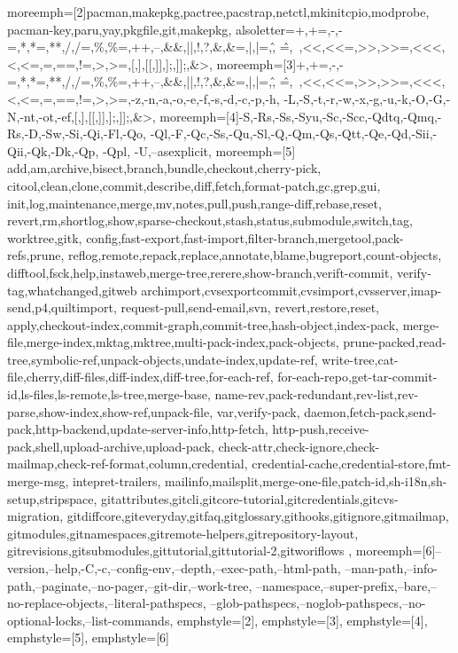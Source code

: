 {  %
  moreemph=[2]{pacman,makepkg,pactree,pacstrap,netctl,mkinitcpio,modprobe,
  pacman-key,paru,yay,pkgfile,git,makepkg},
  alsoletter={+,+=,-,-=,*,*=,**,/,/=,\%,\%=,++,--,\&\&,||,!,?,\&,\&=,|,|=,\^,
  \^=,~,<<,<<=,>>,>>=,<<<,<,<=,=,==,!=,>,>=,[,],[[,]],];,]];,\&>},
  moreemph=[3]{+,+=,-,-=,*,*=,**,/,/=,\%,\%=,++,--,\&\&,||,!,?,\&,\&=,|,|=,\^,
  \^=,~,<<,<<=,>>,>>=,<<<,<,<=,=,==,!=,>,>=,-z,-n,-a,-o,-e,-f,-s,-d,-c,-p,-h,
  -L,-S,-t,-r,-w,-x,-g,-u,-k,-O,-G,-N,-nt,-ot,-ef,[,],[[,]],];,]];,\&>},
  moreemph=[4]{-S,-Rs,-Ss,-Syu,-Sc,-Scc,-Qdtq,-Qmq,-Rs,-D,-Sw,-Si,-Qi,-Fl,-Qo,
  -Ql,-F,-Qc,-Ss,-Qu,-Sl,-Q,-Qm,-Qs,-Qtt,-Qe,-Qd,-Sii,-Qii,-Qk,-Dk,-Qp, -Qpl,
  -U,--asexplicit},
  moreemph=[5]{%
    add,am,archive,bisect,branch,bundle,checkout,cherry-pick,
    citool,clean,clone,commit,describe,diff,fetch,format-patch,gc,grep,gui,
    init,log,maintenance,merge,mv,notes,pull,push,range-diff,rebase,reset,
    revert,rm,shortlog,show,sparse-checkout,stash,status,submodule,switch,tag,
    worktree,gitk,
    config,fast-export,fast-import,filter-branch,mergetool,pack-refs,prune,
    reflog,remote,repack,replace,annotate,blame,bugreport,count-objects,
    difftool,fsck,help,instaweb,merge-tree,rerere,show-branch,verift-commit,
    verify-tag,whatchanged,gitweb
    archimport,cvsexportcommit,cvsimport,cvsserver,imap-send,p4,quiltimport,
    request-pull,send-email,svn,
    revert,restore,reset,
    apply,checkout-index,commit-graph,commit-tree,hash-object,index-pack,
    merge-file,merge-index,mktag,mktree,multi-pack-index,pack-objects,
    prune-packed,read-tree,symbolic-ref,unpack-objects,undate-index,update-ref,
    write-tree,cat-file,cherry,diff-files,diff-index,diff-tree,for-each-ref,
    for-each-repo,get-tar-commit-id,ls-files,ls-remote,ls-tree,merge-base,
    name-rev,pack-redundant,rev-list,rev-parse,show-index,show-ref,unpack-file,
    var,verify-pack,
    daemon,fetch-pack,send-pack,http-backend,update-server-info,http-fetch,
    http-push,receive-pack,shell,upload-archive,upload-pack,
    check-attr,check-ignore,check-mailmap,check-ref-format,column,credential,
    credential-cache,credential-store,fmt-merge-msg, intepret-trailers,
    mailinfo,mailsplit,merge-one-file,patch-id,sh-i18n,sh-setup,stripspace,
  gitattributes,gitcli,gitcore-tutorial,gitcredentials,gitcvs-migration,
  gitdiffcore,giteveryday,gitfaq,gitglossary,githooks,gitignore,gitmailmap,
  gitmodules,gitnamespaces,gitremote-helpers,gitrepository-layout,
  gitrevisions,gitsubmodules,gittutorial,gittutorial-2,gitworiflows
  },
  moreemph=[6]{--version,--help,-C,-c,--config-env,--depth,--exec-path,--html-path,
  --man-path,--info-path,--paginate,--no-pager,--git-dir,--work-tree,
  --namespace,--super-prefix,--bare,--no-replace-objects,--literal-pathspecs,
  --glob-pathspecs,--noglob-pathspecs,--no-optional-locks,--list-commands},
  emphstyle=[2]{\color{blue}},%
  emphstyle=[3]{\bfseries\color{magenta}},%
  emphstyle=[4]{\color{cyan}},%
  emphstyle=[5]{\color{cyan}},%
  emphstyle=[6]{\color{cyan}}%
}
